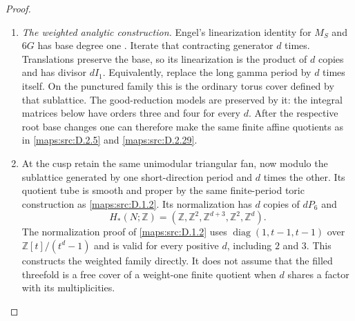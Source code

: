 \begin{proof}
\begin{enumerate}[label=\arabic*.,leftmargin=*]
\item \emph{The weighted analytic construction.}
Engel's linearization identity for $M_S$ and $6G$
has base degree one
\cite[Lemma 2.1 and Remark 8.5]{manEngel26}.
Iterate that contracting generator $d$ times.
Translations preserve the base, so its linearization
is the product of $d$ copies and has divisor $dI_1$.
Equivalently, replace the long gamma period by $d$
times itself. On the punctured family this is the
ordinary torus cover defined by that sublattice.
The good-reduction models are preserved by it:
the integral matrices below have orders three and
four for every $d$. After the respective root base
changes one can therefore make the same finite
affine quotients as in \ref{maps:src:D.2.5} and \ref{maps:src:D.2.29}.

\item At the cusp retain the same unimodular triangular
fan, now modulo the sublattice generated by one
short-direction period and $d$ times the other.
Its quotient tube is smooth and proper by the same
finite-period toric construction as \ref{maps:src:D.1.2}. Its
normalization has $d$ copies of $dP_6$ and
\[
 H_*(N;\mathbb Z)
 =(\mathbb Z,\mathbb Z^2,\mathbb Z^{d+3},
                         \mathbb Z^2,\mathbb Z^d).         \tag{D.WE9}\label{maps:eq:D.WE9}
\]
The normalization proof of \ref{maps:src:D.1.2} uses
$\operatorname{diag}(1,t-1,t-1)$ over
$\mathbb Z[t]/(t^d-1)$ and is valid for every positive
$d$, including $2$ and $3$.
This constructs the weighted family directly.
It does not assume that the filled threefold is a
free cover of a weight-one finite quotient when $d$
shares a factor with its multiplicities.


\end{enumerate}
\end{proof}

